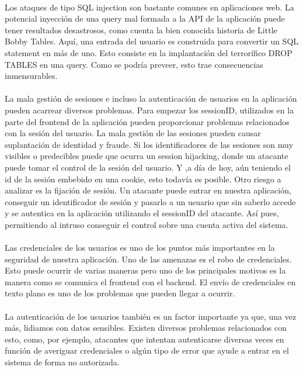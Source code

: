 \paragraph{}
Los ataques de tipo SQL injection son bastante comunes en aplicaciones
web. La potencial inyección de una query mal formada a la API de la
aplicación puede tener resultados desastrosos, como cuenta la bien
conocida historia de Little Bobby Tables. Aquí, una entrada del
usuario es construida para convertir un SQL statement en más de
uno. Esto consiste en la implantación del terrorífico DROP TABLES en
una query. Como se podría preveer, esto trae consecuencias
inmensurables.
\paragraph{}
La mala gestión de sesiones e incluso la autenticación de usuarios en
la aplicación pueden acarrear diversos problemas. Para empezar los
sessionID, utilizados en la parte del frontend de la aplicación pueden
proporcionar problemas relacionados con la sesión del usuario. La mala
gestión de las sesiones pueden causar suplantación de identidad y
fraude. Si los identificadores de las sesiones son muy visibles o
predecibles puede que ocurra un session hijacking, donde un atacante
puede tomar el control de la sesión del usuario. Y ,a día de hoy, aún
teniendo el id de la sesión embebido en una cookie, esto todavía es
posible. Otro riesgo a analizar es la fijación de sesión. Un atacante
puede entrar en nuestra aplicación, conseguir un identificador de
sesión y pasarlo a un usuario que sin saberlo accede y se autentica en
la aplicación utilizando el sessionID del atacante. Así pues,
permitiendo al intruso conseguir el control sobre una cuenta activa
del sistema.
\paragraph{}
Las credenciales de los usuarios es uno de los puntos más importantes
en la seguridad de nuestra aplicación. Uno de las amenazas es el robo
de credenciales. Esto puede ocurrir de varias maneras pero uno de los
principales motivos es la manera como se comunica el frontend con el
backend. El envío de credenciales en texto plano es uno de los
problemas que pueden llegar a ocurrir.
\paragraph{}
La autenticación de los usuarios también es un factor importante ya
que, una vez más, lidiamos con datos sensibles. Existen diversos
problemas relacionados con esto, como, por ejemplo, atacantes que
intentan autenticarse diversas veces en función de averiguar
credenciales o algún tipo de error que ayude a entrar en el sistema de
forma no autorizada.
